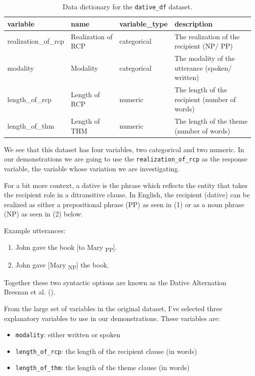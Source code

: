 \documentclass[
  letterpaper,
  DIV=11,
  numbers=noendperiod]{scrreprt}
\providecommand{\tightlist}{%
  \setlength{\itemsep}{0pt}\setlength{\parskip}{0pt}}\usepackage{longtable,booktabs,array}
\theoremstyle{definition}
\theoremstyle{remark}
\begin{document}
\begin{longtable}[t]{llll}

\caption{\label{tbl-ida-cat-data-dict}Data dictionary for the
\texttt{dative\_df} dataset.}

\tabularnewline

\toprule
variable & name & variable\_type & description\\
\midrule
realization\_of\_rcp & Realization of RCP & categorical & The realization of the recipient (NP/ PP)\\
modality & Modality & categorical & The modality of the utterance (spoken/ written)\\
length\_of\_rcp & Length of RCP & numeric & The length of the recipient (number of words)\\
length\_of\_thm & Length of THM & numeric & The length of the theme (number of words)\\
\bottomrule

\end{longtable}

We see that this dataset has four variables, two categorical and two
numeric. In our demonstrations we are going to use the
\texttt{realization\_of\_rcp} as the response variable, the variable
whose variation we are investigating.

For a bit more context, a dative is the phrase which reflects the entity
that takes the recipient role in a ditransitive clause. In English, the
recipient (dative) can be realized as either a prepositional phrase (PP)
as seen in (1) or as a noun phrase (NP) as seen in (2) below.

Example utterances:

\begin{enumerate}
\def\labelenumi{\arabic{enumi}.}
\tightlist
\item
  John gave the book {[}to Mary \textsubscript{PP}{]}.
\item
  John gave {[}Mary \textsubscript{NP}{]} the book.
\end{enumerate}

Together these two syntactic options are known as the Dative Alternation
Bresnan et al. ().

From the large set of variables in the original dataset, I've selected
three explanatory variables to use in our demonstrations. These
variables are:

\begin{itemize}
\tightlist
\item
  \texttt{modality}: either written or spoken
\item
  \texttt{length\_of\_rcp}: the length of the recipient clause (in
  words)
\item
  \texttt{length\_of\_thm}: the length of the theme clause (in words)
\end{itemize}
\end{document}
